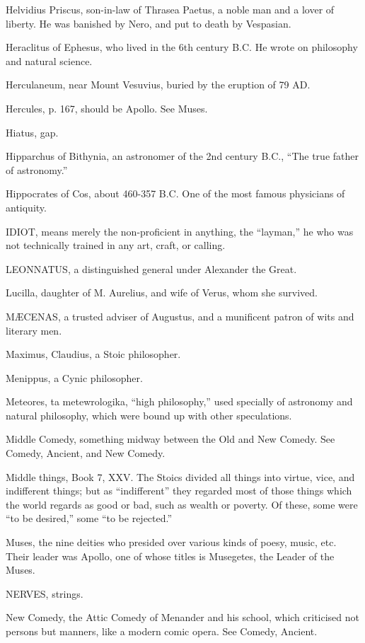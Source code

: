Helvidius Priscus, son-in-law of Thrasea Paetus, a noble man and a lover
of liberty. He was banished by Nero, and put to death by Vespasian.

Heraclitus of Ephesus, who lived in the 6th century B.C. He wrote on
philosophy and natural science.

Herculaneum, near Mount Vesuvius, buried by the eruption of 79 AD.

Hercules, p. 167, should be Apollo. See Muses.

Hiatus, gap.

Hipparchus of Bithynia, an astronomer of the 2nd century B.C., ``The true
father of astronomy.''

Hippocrates of Cos, about 460-357 B.C. One of the most famous physicians
of antiquity.

IDIOT, means merely the non-proficient in anything, the ``layman,'' he who
was not technically trained in any art, craft, or calling.

LEONNATUS, a distinguished general under Alexander the Great.

Lucilla, daughter of M. Aurelius, and wife of Verus, whom she survived.

MÆCENAS, a trusted adviser of Augustus, and a munificent patron of wits
and literary men.

Maximus, Claudius, a Stoic philosopher.

Menippus, a Cynic philosopher.

Meteores, ta metewrologika, ``high philosophy,'' used specially of astronomy
and natural philosophy, which were bound up with other speculations.

Middle Comedy, something midway between the Old and New Comedy. See
Comedy, Ancient, and New Comedy.

Middle things, Book 7, XXV. The Stoics divided all things into virtue,
vice, and indifferent things; but as ``indifferent'' they regarded most of
those things which the world regards as good or bad, such as wealth or
poverty. Of these, some were ``to be desired,'' some ``to be rejected.''

Muses, the nine deities who presided over various kinds of poesy, music,
etc. Their leader was Apollo, one of whose titles is Musegetes, the Leader
of the Muses.

NERVES, strings.

New Comedy, the Attic Comedy of Menander and his school, which criticised
not persons but manners, like a modern comic opera. See Comedy, Ancient.

